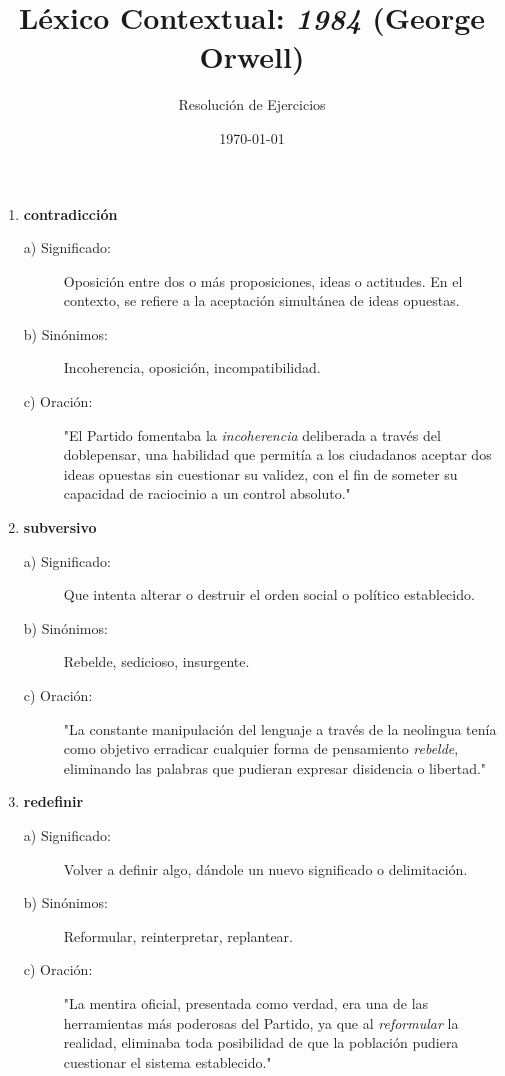 \documentclass[11pt, a4paper]{article}
\title{Léxico Contextual: \textit{1984} (George Orwell)}
\author{Resolución de Ejercicios} %
\date{\today} %
\begin{document}
\maketitle %


\begin{enumerate} %

    \item \textbf{contradicción}
    \begin{description}
        \item[a) Significado:] Oposición entre dos o más proposiciones, ideas o actitudes. En el contexto, se refiere a la aceptación simultánea de ideas opuestas.
        \item[b) Sinónimos:] Incoherencia, oposición, incompatibilidad.
        \item[c) Oración:] "El Partido fomentaba la \textit{incoherencia} deliberada a través del doblepensar, una habilidad que permitía a los ciudadanos aceptar dos ideas opuestas sin cuestionar su validez, con el fin de someter su capacidad de raciocinio a un control absoluto."
    \end{description}

    \item \textbf{subversivo}
    \begin{description}
        \item[a) Significado:] Que intenta alterar o destruir el orden social o político establecido.
        \item[b) Sinónimos:] Rebelde, sedicioso, insurgente.
        \item[c) Oración:] "La constante manipulación del lenguaje a través de la neolingua tenía como objetivo erradicar cualquier forma de pensamiento \textit{rebelde}, eliminando las palabras que pudieran expresar disidencia o libertad."
    \end{description}

    \item \textbf{redefinir}
    \begin{description}
        \item[a) Significado:] Volver a definir algo, dándole un nuevo significado o delimitación.
        \item[b) Sinónimos:] Reformular, reinterpretar, replantear.
        \item[c) Oración:] "La mentira oficial, presentada como verdad, era una de las herramientas más poderosas del Partido, ya que al \textit{reformular} la realidad, eliminaba toda posibilidad de que la población pudiera cuestionar el sistema establecido."
    \end{description}


\end{enumerate}
\end{document}
